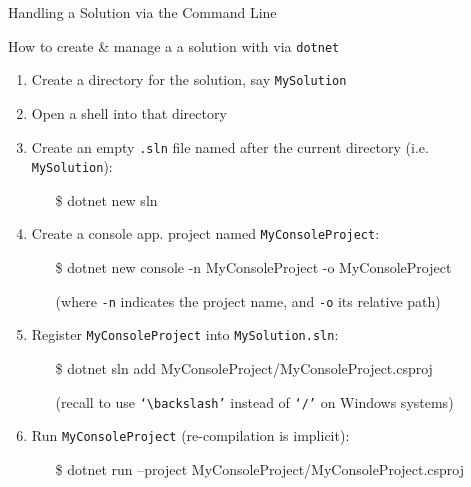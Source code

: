 \documentclass[presentation]{beamer}
\newcommand{\bs}{$\backslash$}
\begin{document}
\begin{frame}[allowframebreaks]{Handling a Solution via the Command Line}
    \begin{exampleblock}{How to create \& manage a a solution with via \texttt{dotnet}}
        \begin{enumerate}
            \item Create a directory for the solution, say \texttt{MySolution}
            \item Open a shell into that directory
            \item Create an empty \texttt{.sln} file named after the current directory (i.e. \texttt{MySolution}):
            \begin{itemize}\ttfamily
                \item[\$] dotnet new sln
            \end{itemize}
            \item Create a \csharp console app. project named \texttt{MyConsoleProject}:
            \begin{itemize}\ttfamily\footnotesize
                \item[\$] dotnet new console -n MyConsoleProject -o MyConsoleProject
                \normalfont 
                \item[] (where \texttt{-n} indicates the project name, and \texttt{-o} its relative path) 
            \end{itemize}
            \item Register \texttt{MyConsoleProject} into \texttt{MySolution.sln}:
            \begin{itemize}\ttfamily\footnotesize
                \item[\$] dotnet sln add MyConsoleProject/MyConsoleProject.csproj
                \normalfont 
                \item[] (recall to use \texttt{`\bs{}'} instead of \texttt{`/'} on Windows systems) 
            \end{itemize}    
            \item Run \texttt{MyConsoleProject} (re-compilation is implicit):
            \begin{itemize}\ttfamily
                \item[\$] dotnet run --project MyConsoleProject/MyConsoleProject.csproj
            \end{itemize}
        \end{enumerate}
    \end{exampleblock}
    
\end{frame}
\end{document}
